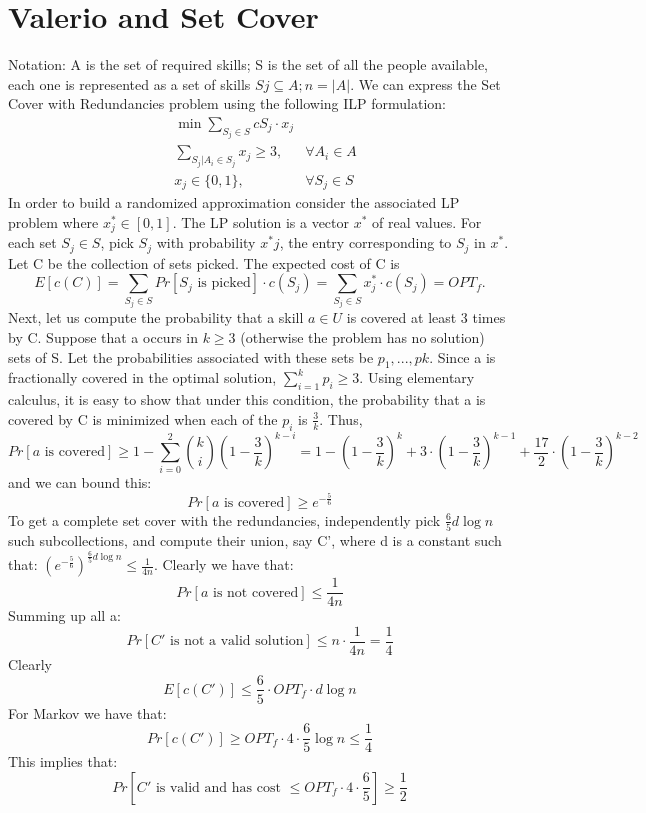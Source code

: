 \section{Valerio and Set Cover}
Notation: A is the set of required skills; S is the set of all the people available, each one is represented as a set of skills $Sj \subseteq A; n = |A|$.
We can express the Set Cover with Redundancies problem using the following ILP formulation:
\begin{align*}
&\min\sum_{S_j \in S} c{S_j} \cdot x_j \\
&\sum_{S_j | A_i \in S_j} x_j \geq 3, & \forall A_i \in A \\
&x_j \in \{0, 1\}, & \forall S_j \in S
\end{align*}
In order to build a randomized approximation consider the associated LP problem where $x^*_j \in [0, 1]$. The LP solution is a vector $x^*$ of real values.
For each set $S_j \in S$, pick $S_j$ with probability $x^*j$, the entry corresponding to $S_j$ in $x^*$. Let C be the collection of sets picked. The expected cost of C is
\[
E[c(C)] = \sum_{S_j \in S} Pr[S_j \text{ is picked}] \cdot c(S_j) = \sum_{S_j \in S} x^*_j \cdot c(S_j) = OPT_f.
\]
Next, let us compute the probability that a skill $a \in U$ is covered at least 3 times by C. Suppose that a occurs in $k \geq 3$ (otherwise the problem has no solution) sets of S. Let the probabilities associated with these sets be $p_1, ... ,pk.$ Since a is fractionally covered in the optimal solution, $ \sum_{i = 1}^{k} p_i \geq 3.$ Using elementary calculus, it is easy to show that under this condition, the probability that a is covered by C is minimized when each of the $p_i$ is $\frac{3}{k}.$ Thus,
\[
Pr[a \text{ is covered}] \geq  1 - \sum_{i=0}^{2} \binom{k}{i} (1-\frac{3}{k})^{k-i}      =  1 - (1-\frac{3}{k})^k + 3 \cdot (1-\frac{3}{k})^{k-1} + \frac{17}{2}\cdot (1-\frac{3}{k})^{k-2}
\]
and we can bound this:
\[
Pr[a \text{ is covered}] \geq  e^{-\frac{5}{6}}
\]
To get a complete set cover with the redundancies, independently pick $\frac{6}{5}d \log n$ such subcollections, and compute their union, say C', where d is a constant such that:
$({e^{-\frac{5}{6}}})^{\frac{6}{5} d\log n} \leq \frac{1}{4n}$. Clearly we have that:
\[
Pr[a \text{ is not covered}] \leq \frac{1}{4n}
\]
Summing up all a:
\[
Pr[C' \text{ is not a valid solution}] \leq n \cdot \frac{1}{4n} = \frac{1}{4}
\]
Clearly
\[
E[c(C')] \leq \frac{6}{5} \cdot OPT_f \cdot d \log n
\]
For Markov we have that:
\[
Pr[c(C')] \geq OPT_f \cdot 4\cdot \frac{6}{5} \log n \leq \frac{1}{4}
\]
This implies that:
\[
Pr[C' \text{ is valid and has cost } \leq OPT_f \cdot 4\cdot \frac{6}{5}] \geq \frac{1}{2}
\]



